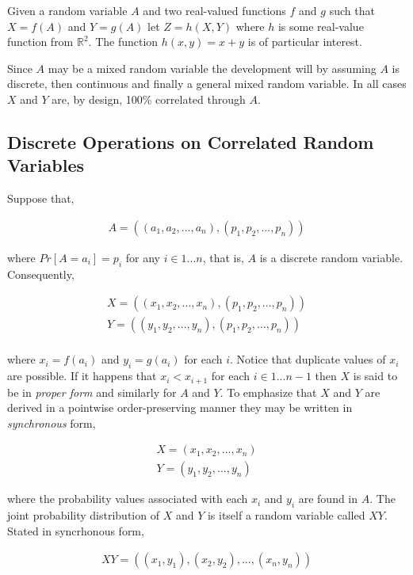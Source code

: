 Given a random variable $A$ and two real-valued functions $f$ and $g$ such that $X = f(A)$ and $Y = g(A)$ let $Z = h(X,Y)$ where $h$ is some real-value function from $\mathbb{R}^2$. The function $h(x,y) = x+y$ is of particular interest.

Since $A$ may be a mixed random variable the development will by assuming $A$ is discrete, then continuous and finally a general mixed random variable. In all cases $X$ and $Y$ are, by design, 100\% correlated through $A$.

\subsection{Discrete Operations on Correlated Random Variables}

Suppose that,

\begin{align*}
A = ((a_1, a_2, ..., a_n), (p_1, p_2, ..., p_n))
\end{align*}

where $Pr[A = a_i] = p_i$ for any $i \in 1...n$, that is, $A$ is a discrete random variable. Consequently,

\begin{align*}
X = ((x_1, x_2, ..., x_n), (p_1, p_2, ..., p_n))\\
Y = ((y_1, y_2, ..., y_n), (p_1, p_2, ..., p_n))\\
\end{align*}

where $x_i = f(a_i)$ and $y_i = g(a_i)$  for each $i$. Notice that duplicate values of $x_i$ are possible. If it happens that $x_i < x_{i+1}$ for each $i \in 1...n-1$ then $X$ is said to be in \emph{proper form} and similarly for $A$ and $Y$. To emphasize that $X$ and $Y$ are derived in a pointwise order-preserving manner they may be written in \emph{synchronous} form,

\begin{align*}
X = (x_1, x_2, ..., x_n)\\
Y = (y_1, y_2, ..., y_n)
\end{align*}

where the probability values associated with each $x_i$ and $y_i$ are found in $A$. The joint probability distribution of $X$ and $Y$ is itself a random variable called $XY$. Stated in syncrhonous form,

\begin{align*}
XY = ((x_1, y_1), (x_2, y_2), ..., (x_n, y_n))
\end{align*}

